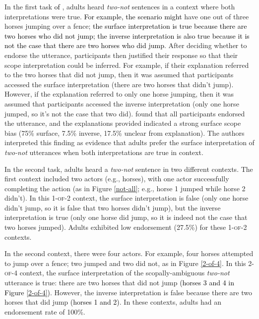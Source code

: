 \documentclass[cm]{glossa}
\newcommand{\lsp}[1]{\textcolor{red}{[lsp: #1]}}
\newcommand{\lp}[1]{\textcolor{black}{#1}} %
\begin{document}
In the first task \lp{of \cite{musolinolidz2003}}, adults heard \emph{two-not} sentences in a context where both interpretations were true. 
\lp{For example, the scenario might} have one out of three horses jumping over a fence; 
\lp{the {surface} interpretation is true because there are two horses who did not jump; 
the {inverse} interpretation is also true because it is not the case that there are two horses who did jump}. 
After deciding whether to endorse the utterance, participants then justified their response so that their scope interpretation could be inferred. For example, if their explanation referred to the two horses that did not jump, then it was assumed that participants accessed the {surface} interpretation (there are two horses that didn't jump).
However, if the explanation referred to only one horse jumping, then it was assumed that participants accessed the {inverse} interpretation (only one horse jumped, so it's not the case that two did).
\citeauthor{musolinolidz2003} found that all participants endorsed the utterance, and the  explanations provided indicated a strong surface scope bias (75\% {surface}, 7.5\% {inverse}, 17.5\% unclear from explanation). The authors interpreted this finding as evidence that adults prefer the {surface} interpretation of \emph{two-not} utterances when both interpretations are true in context. 

In the second task, adults heard a \emph{two-not} sentence in two different contexts. The first context included two actors (e.g., horses), with one actor successfully completing the action (as in Figure \ref{not-all}; e.g., horse 1 jumped while horse 2 didn't). In this \textsc{1-of-2} context, the {surface} interpretation is false (only one horse didn't jump, so it is false that two horses didn't jump), but the {inverse} interpretation is true (only one horse did jump, so it is indeed not the case that two horses jumped). Adults exhibited low endorsement (27.5\%) for these \textsc{1-of-2} contexts. 

In the second context, there were four actors. For example, four horses attempted to jump over a fence; two jumped %
and two did not, %
as in Figure \ref{2-of-4}.  In this \textsc{2-of-4} context, the {surface} interpretation of the scopally-ambiguous \emph{two-not} utterance is true: there are two horses that did not jump \lp{(horses 3 and 4 in Figure \ref{2-of-4})}. However, the {inverse} interpretation is false because there are two horses that did jump \lp{(horses 1 and 2)}. In these contexts, adults had an endorsement rate of 100\%. 
\end{document}
